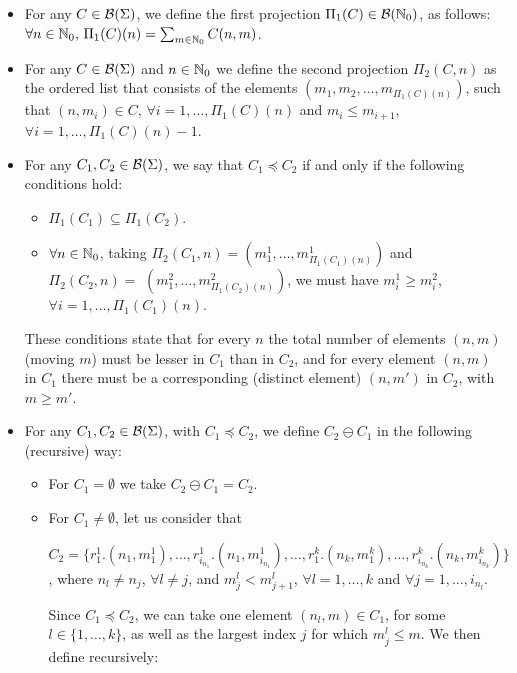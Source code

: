 \begin{enumerate}
\begin{itemize}
\item For any $C \in {\cal B}(\Sigma)$, 
we define the first projection
$\Pi_1(C) \in {\cal B}(\mathbb{N}_{0})$, 
as follows: $\forall n \in \mathbb{N}_{0},\,
\Pi_1(C)(n) = \sum_{m\in \mathbb{N}_{0}} C(n,m)$.
%
\item For any $C \in {\cal B}(\Sigma)$
and $n\in \mathbb{N}_{0}$ we define the second projection 
$\Pi_2(C,n)$ as the ordered list that consists of the
elements $(m_1,m_2,\ldots,m_{\Pi_1(C)(n)})$,
such that $(n,m_i) \in C$, $\forall i=1,\ldots, \Pi_1(C)(n)$
and $m_i \leq m_{i+1}$,
$\forall i=1,\ldots, \Pi_1(C)(n)-1$.
%
\item For any $C_1,C_2 \in {\cal B}(\Sigma)$, we say that
$C_1 \preceq C_2$ if and only if the following conditions hold:
  \begin{itemize}
  \item $\Pi_1(C_1) \subseteq \Pi_1(C_2)$.
  \item \mbox{$\forall n \in \mathbb{N}_{0}$}, taking \mbox{$\Pi_2(C_1,n) = (m^1_1,\ldots,
        m^1_{\Pi_1(C_1)(n)})$} and
        \mbox{$\Pi_2(C_2,n) = $} \linebreak
        $(m^2_1,\ldots,m^2_{\Pi_1(C_2)(n)})$,
        we must have  $m^1_i \geq m^2_i$, $\forall i=1,\ldots,
        \Pi_1(C_1)(n)$.
  \end{itemize}
%
%  
These conditions state that for every $n$ the total number of
elements $(n,m)$ (moving $m$) must be lesser in $C_1$ than in $C_2$, and 
for every element $(n,m)$ in $C_1$ there must be a 
corresponding (distinct element) $(n,m')$ in $C_2$, with $m\geq m'$.
%
\item For any $C_1,C_2 \in {\cal B}(\Sigma)$, with $C_1 \preceq C_2$,
we define $C_2 \ominus C_1$ in the following (recursive) way: 
  \begin{itemize}
  \item For $C_1 = \emptyset$ we take $C_2 \ominus C_1 = C_2$.
  \item For $C_1 \neq \emptyset$, let us consider that 

        \noindent $C_2 = \{ r^1_1.(n_1,m^1_1), \ldots,
         r^1_{i_{n_{1}}}.(n_1,m^1_{i_{n_{1}}}),
        \ldots, r^k_1.(n_k,m^k_1),\ldots, r^k_{i_{n_{k}}}.(n_k,m^k_{i_{n_{k}}}) \}$,
        where $n_l \neq n_j$, $\forall l \neq j$, and
        $m^l_j < m^l_{j+1}$, $\forall l=1,\ldots,k$ and $\forall
        j=1,\ldots,i_{n_{l}}$.

        Since $C_1 \preceq C_2$, we can take one element $(n_l,m) \in C_1$, 
        for some $l\in \{1,\ldots,k\}$, as well as the largest index $j$
        for which $m^l_{j} \leq m$. We then define recursively:
       

\end{itemize}
\end{itemize}
\end{enumerate}
